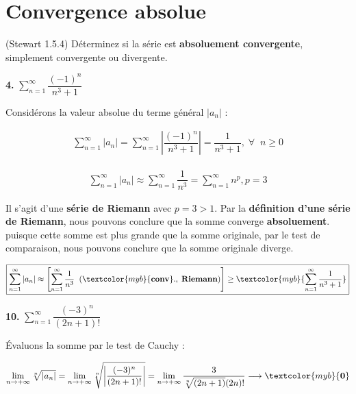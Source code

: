 \documentclass{report}
\begin{document}
    \section{Convergence absolue}

    \begin{Exercice}{(Stewart 1.5.4)}{}
       Déterminez si la série est \textbf{absoluement convergente}, 
       simplement convergente ou divergente. 
    \end{Exercice}

    \vspace{1em} 
    \noindent %
    \textbf{4.} $\sum_{n=1}^{\infty }\dfrac{(-1)^n}{n^3 + 1}$ 

    Considérons la valeur absolue du terme général $|a_n|$ :

    \begin{align*}
        \sum_{n=1}^{\infty }|a_n| = 
        \sum_{n=1}^{\infty }\left|\dfrac{(-1)^n}{n^3 +1}\right|
        = 
        \dfrac{1}{n^3 + 1}, \; \forall \;\; n \geq 0 
    \end{align*}


    \begin{align*}
        \sum_{n=1}^{\infty }| a_n | \approx 
        \sum_{n=1}^{\infty }\dfrac{1}{n^3} =
        \sum_{n=1}^{\infty }n^p, p = 3
    \end{align*}

    Il s'agit d'une \textbf{série de Riemann} avec $p = 3 > 1$. 
    Par la \textbf{définition d'une série de Riemann}, nous pouvons 
    conclure que la somme converge \textbf{absoluement}. puisque cette 
    somme est plus grande que la somme originale, par le test 
    de comparaison, nous pouvons conclure que la somme originale 
    diverge. 

    \begin{align*}
        \boxed{
        \sum_{n=1}^{\infty }|a_n| \approx 
        \left[
        \sum_{n=1}^{\infty } \dfrac{1}{n^3} \;\;
        (\textcolor{myb}{\textbf{conv}}., \; \textbf{Riemann}) 
        \right]
        \geq 
        \textcolor{myb}{
            \sum_{n=1}^{\infty } \dfrac{1}{n^3 + 1}
        }  
    }
    \end{align*}            


    \vspace{1em}
    \noindent %
    \textbf{10.} $\sum_{n=1}^{\infty }\dfrac{(-3)^n}{(2n + 1)!}$ 

    Évaluons la somme par le test de Cauchy :

    \begin{align*}
        \lim\limits_{n \to+\infty }\sqrt[n]{|a_n|} =  
        \lim\limits_{n \to+\infty } 
        \sqrt[n]{\left|\dfrac{(-3)^n}{(2n + 1)!}\right|} 
        = 
        \lim\limits_{n \to+\infty } 
        \frac{3}{\sqrt[n]{(2n+1)}(2n)!} 
        \longrightarrow \textcolor{myb}{\textbf{0}} 
    \end{align*} 
\end{document}
